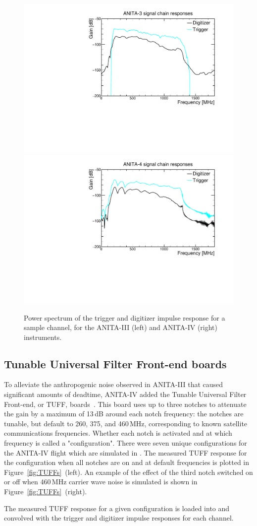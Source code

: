 \begin{figure}[!h]\centering
  \includegraphics[width=.45\linewidth]{./Figs/A3ImpulseResponses.pdf}
  \includegraphics[width=.45\linewidth]{./Figs/A4ImpulseResponses.pdf}
  \caption{Power spectrum of the trigger and digitizer impulse
    response for a sample channel, for the ANITA-III (left) and ANITA-IV (right) instruments. 
    }
  \label{fig:ANITA_ImpulseResponses}
\end{figure}


\subsection{Tunable Universal Filter Front-end boards}
\label{subsec:tuffs}
To alleviate the anthropogenic noise observed in ANITA-III that caused
significant amounts of deadtime, ANITA-IV added the Tunable Universal
Filter Front-end, or TUFF, boards~\cite{Allison:2017vtk}.
This board uses up to three notches to attenuate
the gain by a maximum of 13\,dB around each notch
frequency:
the notches are tunable, but default to 260, 375, and 460\,MHz, corresponding to known satellite communications frequencies. 
Whether each notch is activated and at which frequency is called
a "configuration".
There were seven unique configurations for the ANITA-IV flight  which are simulated in 
\icemc. 
The measured TUFF response for the configuration when all notches are on and at default frequencies is plotted in Figure~\ref{fig:TUFFs}~(left). 
An example of the effect of the third notch switched on or off when 460\,MHz carrier wave noise is simulated is shown in Figure~\ref{fig:TUFFs}~(right).

The measured TUFF response for a given configuration is loaded
into \icemc and convolved with the trigger and digitizer impulse
responses for each channel. 

